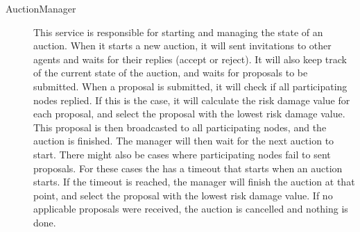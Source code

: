 \begin{description}
    \item[AuctionManager] This service is responsible for starting and managing the state of an auction. When it starts a new auction, it will sent invitations to other agents and waits for their replies (accept or reject). It will also keep track of the current state of the auction, and waits for proposals to be submitted. When a proposal is submitted, it will check if all participating nodes replied. If this is the case, it will calculate the risk damage value for each proposal, and select the proposal with the lowest risk damage value. This proposal is then broadcasted to all participating nodes, and the auction is finished. The manager will then wait for the next auction to start. There might also be cases where participating nodes fail to sent proposals. For these cases the  has a timeout that starts when an auction starts. If the timeout is reached, the manager will finish the auction at that point, and select the proposal with the lowest risk damage value. If no applicable proposals were received, the auction is cancelled and nothing is done.
\end{description}



